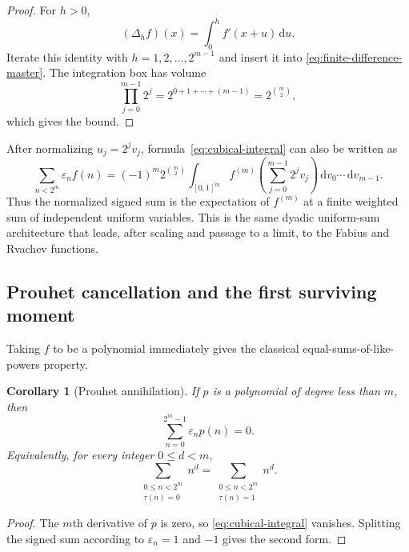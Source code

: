 \documentclass[11pt,oneside]{article}
\newtheorem{corollary}[theorem]{Corollary}
\theoremstyle{definition}
\theoremstyle{remark}
\newcommand{\dd}{\,\mathrm d}
\begin{document}
\begin{proof}
For $h>0$,
\[
  (\Delta_hf)(x)=\int_0^h f'(x+u)\dd u.
\]
Iterate this identity with $h=1,2,\ldots,2^{m-1}$ and insert it into
\eqref{eq:finite-difference-master}.  The integration box has volume
\[
  \prod_{j=0}^{m-1}2^j=2^{0+1+\cdots+(m-1)}=2^{\binom m2},
\]
which gives the bound.
\end{proof}

After normalizing $u_j=2^jv_j$, formula~\eqref{eq:cubical-integral} can also be
written as
\begin{equation}
 \sum_{n<2^m}\varepsilon_nf(n)
 =(-1)^m2^{\binom m2}
 \int_{[0,1]^m}
 f^{(m)}\left(\sum_{j=0}^{m-1}2^jv_j\right)
 \dd v_0\cdots\dd v_{m-1}.                                \label{eq:unit-cube-integral}
\end{equation}
Thus the normalized signed sum is the expectation of $f^{(m)}$ at a finite
weighted sum of independent uniform variables.  This is the same dyadic
uniform-sum architecture that leads, after scaling and passage to a limit, to
the Fabius and Rvachev functions.

\subsection{Prouhet cancellation and the first surviving moment}

Taking $f$ to be a polynomial immediately gives the classical equal-sums-of-like-
powers property.

\begin{corollary}[Prouhet annihilation]
\label{cor:Prouhet-annihilation}
If $p$ is a polynomial of degree less than $m$, then
\begin{equation}
  \boxed{\displaystyle
  \sum_{n=0}^{2^m-1}\varepsilon_np(n)=0.}                  \label{eq:Prouhet-annihilation}
\end{equation}
Equivalently, for every integer $0\le d<m$,
\begin{equation}
 \sum_{\substack{0\le n<2^m\\\tau(n)=0}}n^d
 =
 \sum_{\substack{0\le n<2^m\\\tau(n)=1}}n^d.           \label{eq:Prouhet-two-classes}
\end{equation}
\end{corollary}

\begin{proof}
The $m$th derivative of $p$ is zero, so
\eqref{eq:cubical-integral} vanishes.  Splitting the signed sum according to
$\varepsilon_n=1$ and $-1$ gives the second form.
\end{proof}
\end{document}
